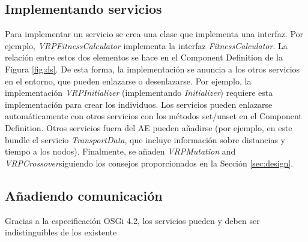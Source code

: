 \documentclass[runningheads]{llncs}
\begin{document}
\subsection{Implementando servicios}
Para implementar un servicio se crea una clase que implementa una interfaz. Por ejemplo,  {\em VRPFitnessCalculator} implementa la interfaz {\em FitnessCalculator}. La relación entre estos dos elementos se hace en el Component Definition de la Figura \ref{fig:ds}. De esta forma, la implementación se anuncia a los otros servicios en el entorno, que pueden enlazarse o desenlazarse. Por ejemplo, la implementación {\em VRPInitializer} (implementando {\em Initializer}) requiere esta implementación para crear los individuos. Los servicios pueden enlazarse automáticamente con otros servicios con los métodos set/unset en el Component Definition. Otros servicios fuera del AE pueden añadirse (por ejemplo, en este bundle el servicio {\em TransportData}, que incluye información sobre distancias y tiempo a los nodos). Finalmente, se añaden {\em VRPMutation} and {\em VRPCrossover}siguiendo los consejos proporcionados en la Sección \ref{sec:design}.

\subsection{Añadiendo comunicación}
Gracias a la especificación OSGi 4.2, los servicios pueden y deben ser indistinguibles de los existente
\end{document}

